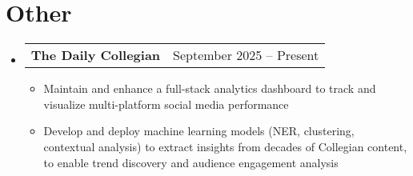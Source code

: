 \documentclass[letterpaper,11pt]{article}
\makeatletter
\newcommand{\resumeItem}[1]{
  \item\small{
    {#1 \vspace{-2pt}}
  }
}
\newcommand{\resumeProjectHeading}[2]{
    \item
    \begin{tabular*}{0.97\textwidth}{l@{\extracolsep{\fill}}r}
      \small#1 & #2 \\
    \end{tabular*}\vspace{-7pt}
}
\newcommand{\resumeSubHeadingListStart}{\begin{itemize}[leftmargin=0.15in, label={}]}
\newcommand{\resumeSubHeadingListEnd}{\end{itemize}}
\newcommand{\resumeItemListStart}{\begin{itemize}}
\newcommand{\resumeItemListEnd}{\end{itemize}\vspace{-5pt}}
\makeatother
\begin{document}
\section{Other}
\resumeSubHeadingListStart
    \vspace{-2pt}
        \resumeProjectHeading
        {\textbf{The Daily Collegian}}{September 2025 -- Present}
            \resumeItemListStart
                \resumeItem{Maintain and enhance a full-stack analytics dashboard to track and visualize multi-platform social media performance}
                \resumeItem{Develop and deploy machine learning models (NER, clustering, contextual analysis) to extract insights from decades of Collegian content, to enable trend discovery and audience engagement analysis}
            \vspace{-2px}
            \resumeItemListEnd
\resumeSubHeadingListEnd
\end{document}
